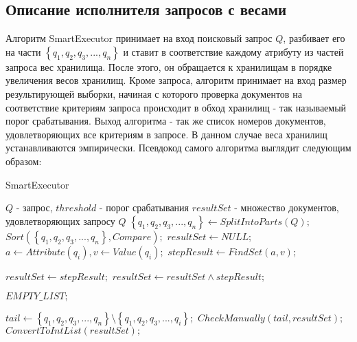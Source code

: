 \documentclass{matmex-diploma}
\begin{document}
    \subsection{Описание исполнителя запросов с весами}
        Алгоритм SmartExecutor принимает на вход поисковый запрос $Q$, разбивает его на части $\left\{ q_1, q_2, q_3, ... , q_n \right\} $ и ставит в соответствие каждому атрибуту из частей запроса вес хранилища. После этого, он обращается к хранилищам в порядке увеличения весов хранилищ. Кроме запроса, алгоритм принимает на вход размер результирующей выборки, начиная с которого проверка документов на соответствие критериям запроса происходит в обход хранилищ - так называемый порог срабатывания. Выход алгоритма - так же список номеров документов, удовлетворяющих все критериям в запросе. В данном случае веса хранилищ устанавливаются эмпирически. Псевдокод самого алгоритма выглядит следующим образом:
        \begin{algorithm}[H]                   
        \caption{SmartExecutor}              
        \label{smart}                        
            \begin{algorithmic}        
                \REQUIRE $Q$ - запрос, $threshold$ - порог срабатывания
                \ENSURE $resultSet$ - множество документов, удовлетворяющих запросу $Q$
                \STATE $\left\{ q_1, q_2, q_3, ... , q_n \right\} \leftarrow SplitIntoParts(Q);$
                \STATE $Sort(\left\{ q_1, q_2, q_3, ... , q_n \right\}, Compare);$
                \STATE $resultSet \leftarrow NULL;$
                    \STATE $a \leftarrow Attribute(q_i), v \leftarrow Value(q_i);$
                    \STATE $stepResult \leftarrow FindSet(a, v);$
                    
                        \STATE $resultSet \leftarrow stepResult;$
                    \ELSE
                        \STATE $resultSet \leftarrow resultSet \land stepResult;$
                    \ENDIF
                    
                        \RETURN $EMPTY\_LIST;$
                    \ENDIF
                    
                        \STATE $tail \leftarrow \left\{ q_1, q_2, q_3, ... , q_n \right\} \setminus \left\{ q_1, q_2, q_3, ... , q_i \right\};$
                        \RETURN $CheckManually(tail, resultSet);$
                    \ENDIF
                \ENDFOR
                \RETURN $ConvertToIntList(resultSet);$
            \end{algorithmic}
        \end{algorithm}
        
\end{document}
